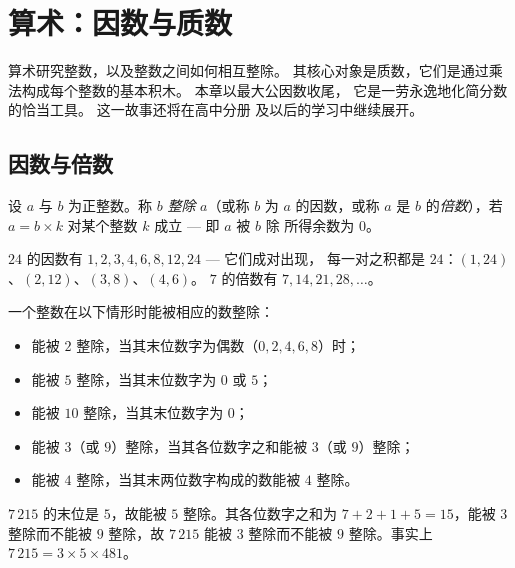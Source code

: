 \chapter{算术：因数与质数}\label{ch:g9:arith}

算术研究整数，以及整数之间如何相互整除。
其核心对象是质数，它们是通过乘法构成每个整数的基本积木。
本章以最大公因数收尾，
它是一劳永逸地化简分数的恰当工具。
这一故事还将在高中分册
及以后的学习中继续展开。

\section{因数与倍数}

\begin{definition}[因数与倍数]\label{def:g9:arith:divisor}
设 $a$ 与 $b$ 为正整数。称 $b$
\emph{整除} $a$（或称 $b$ 为 $a$ 的因数，或称
$a$ 是 $b$ 的\emph{倍数}），若 $a = b \times
k$ 对某个整数 $k$ 成立 --- 即 $a$ 被 $b$ 除
所得余数为 $0$。
\end{definition}

\begin{example}
$24$ 的因数有 $1, 2, 3, 4, 6, 8, 12, 24$ --- 它们成对出现，
每一对之积都是 $24$：$(1,24)$、$(2,12)$、$(3,8)$、$(4,6)$。
$7$ 的倍数有 $7, 14, 21, 28, \dots$。
\end{example}

\begin{proposition}[整除判别法]\label{prop:g9:arith:rules}
一个整数在以下情形时能被相应的数整除：
\begin{itemize}
  \item 能被 $2$ 整除，当其末位数字为偶数（$0, 2, 4, 6, 8$）时；
  \item 能被 $5$ 整除，当其末位数字为 $0$ 或 $5$；
  \item 能被 $10$ 整除，当其末位数字为 $0$；
  \item 能被 $3$（或 $9$）整除，当其各位数字之和能被
        $3$（或 $9$）整除；
  \item 能被 $4$ 整除，当其末两位数字构成的数能被 $4$ 整除。
\end{itemize}
\end{proposition}
\admitted

\begin{example}
$7\,215$ 的末位是 $5$，故能被 $5$ 整除。其各位数字之和为
$7 + 2 + 1 + 5 = 15$，能被 $3$ 整除而不能被 $9$ 整除，故 $7\,215$
能被 $3$ 整除而不能被 $9$ 整除。事实上 $7\,215 = 3 \times 5 \times 481$。
\end{example}

